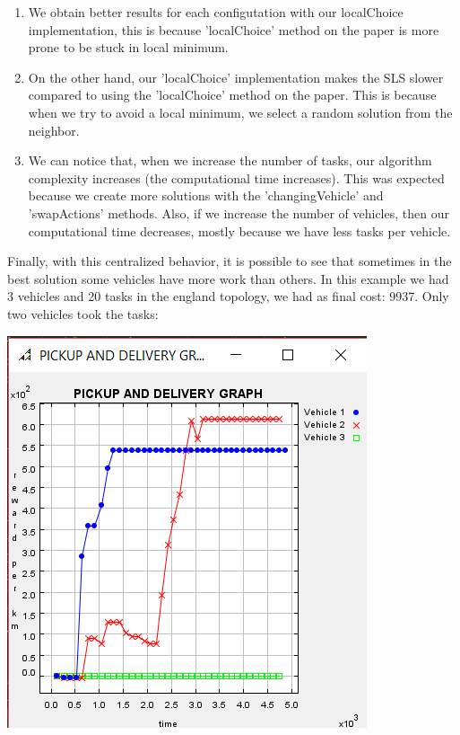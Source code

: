 \documentclass[11pt]{article}
\begin{document}
\begin{enumerate}
\item We obtain better results for each configutation with our localChoice implementation, this is because 'localChoice' method on the paper is more prone to be stuck in local minimum.
\item On the other hand, our 'localChoice' implementation makes the SLS slower compared to using the 'localChoice' method on the paper. This is because when we try to avoid a local minimum, we select a random solution from the neighbor.
\item We can notice that, when we increase the number of tasks, our algorithm complexity increases (the computational time increases). This was expected because we create more solutions with the 'changingVehicle' and 'swapActions' methods. Also, if we increase the number of vehicles, then our computational time decreases, mostly because we have less tasks per vehicle.
\end{enumerate}
\normalsize
Finally, with this centralized behavior, it is possible to see that sometimes in the best solution some vehicles have more work than others. In this example we had 3 vehicles and 20 tasks in the england topology, we had as final cost: 9937. Only two vehicles took the tasks:
\begin{center}
\includegraphics[scale=0.5]{2_vehicl.png}
\end{center}
\end{document}

